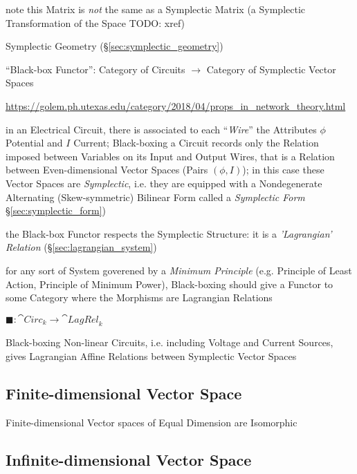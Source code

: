 note this Matrix is \emph{not} the same as a Symplectic Matrix (a Symplectic
Transformation of the Space TODO: xref)

\fist Symplectic Geometry (\S\ref{sec:symplectic_geometry})

``Black-box Functor'': Category of Circuits $\rightarrow$ Category of
Symplectic Vector Spaces %

\url{https://golem.ph.utexas.edu/category/2018/04/props_in_network_theory.html}

in an Electrical Circuit, there is associated to each ``\emph{Wire}'' the
Attributes $\phi$ Potential and $I$ Current; Black-boxing a Circuit records
only the Relation imposed between Variables on its Input and Output Wires, that
is a Relation between Even-dimensional Vector Spaces (Pairs $(\phi,I)$); in
this case these Vector Spaces are \emph{Symplectic}, i.e. they are equipped
with a Nondegenerate Alternating (Skew-symmetric) Bilinear Form called a
\emph{Symplectic Form} \S\ref{sec:symplectic_form})

the Black-box Functor respects the Symplectic Structure: it is a
\emph{'Lagrangian' Relation} (\S\ref{sec:lagrangian_system})

for any sort of System goverened by a \emph{Minimum Principle} (e.g. Principle
of Least Action, Principle of Minimum Power), Black-boxing should give a
Functor to some Category where the Morphisms are Lagrangian Relations

$\blacksquare : \cat{Circ}_k \rightarrow \cat{LagRel}_k$

Black-boxing Non-linear Circuits, i.e. including Voltage and Current Sources,
gives Lagrangian Affine Relations between Symplectic Vector Spaces



\subsection{Finite-dimensional Vector Space}
\label{sec:finite_dimensional_vectorspace}

Finite-dimensional Vector spaces of Equal Dimension are Isomorphic



\subsection{Infinite-dimensional Vector Space}
\label{sec:infinite_dimensional_vectorspace}

